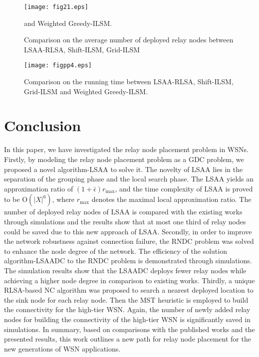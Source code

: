 \documentclass[journal]{IEEEtran}
\begin{document}
\begin{figure}
\begin{center}
\texttt{[image: fig21.eps]}    \caption{Comparison on the average number of deployed relay nodes between LSAA-RLSA, Shift-ILSM, Grid-ILSM} and Weighted Greedy-ILSM.
\label{fig21}                                 \end{center}                                 \end{figure}

\begin{figure}
\begin{center}
\texttt{[image: figpp4.eps]}    \caption{Comparison on the running time between LSAA-RLSA, Shift-ILSM, Grid-ILSM and Weighted Greedy-ILSM.}
\label{figpp4}                                 \end{center}                                 \end{figure}
\section{Conclusion}
In this paper, we have investigated the relay node placement problem in WSNs. Firstly, by modeling the relay node placement problem as a GDC problem, we proposed a novel algorithm-LSAA to solve it. The novelty of LSAA lies in the separation of the grouping phase and the local search phase. The LSAA yields an approximation ratio of $(1+\bar{\epsilon})r_{\max}$, and the time complexity of LSAA is proved to be O$(|X|^6)$, where $r_{\max}$ denotes the maximal local approximation ratio. The number of deployed relay nodes of LSAA is compared with the existing works through simulations and the results show that at most one third of relay nodes could be saved due to this new approach of LSAA. Secondly, in order to improve the network robustness against connection failure, the RNDC problem was solved to enhance the node degree of the network. The efficiency of the solution algorithm-LSAADC to the RNDC problem is demonstrated through simulations. The simulation results show that the LSAADC deploys fewer relay nodes while achieving a higher node degree in comparison to existing works. Thirdly, a unique RLSA-based NC algorithm was proposed to search a nearest deployed location to the sink node for each relay node. Then the MST heuristic is employed to build the connectivity for the high-tier WSN. Again, the number of newly added relay nodes for building the connectivity of the high-tier WSN is significantly saved in simulations. In summary, based on comparisons with the published works and the presented results, this work outlines a new path for relay node placement for the new generations of WSN applications.
\end{document}
